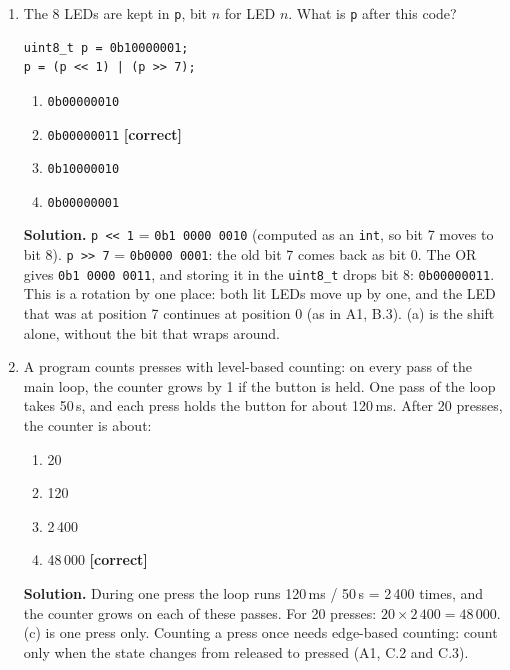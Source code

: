 \documentclass[11pt,a4paper]{article}
\newcommand{\correct}{\quad\textcolor{green!50!black}{\textbf{[correct]}}}
\newenvironment{solution}{\par\noindent\ignorespaces}{\par}
\begin{document}
\begin{enumerate}[label=\textbf{Q\arabic*.}, leftmargin=2.5em, itemsep=6pt]
  \item The 8 LEDs are kept in \texttt{p}, bit $n$ for LED $n$. What is \texttt{p} after this code?
\begin{lstlisting}
uint8_t p = 0b10000001;
p = (p << 1) | (p >> 7);
\end{lstlisting}
  \begin{enumerate}[label=(\alph*)]
    \item \texttt{0b00000010}
    \item \texttt{0b00000011} \correct
    \item \texttt{0b10000010}
    \item \texttt{0b00000001}
  \end{enumerate}
  \begin{solution}
  \textbf{Solution.} \texttt{p <{}< 1} = \texttt{0b1\,0000\,0010} (computed as an \texttt{int}, so bit 7 moves to bit
  8). \texttt{p >{}> 7} = \texttt{0b0000\,0001}: the old bit 7 comes back as bit 0. The OR gives
  \texttt{0b1\,0000\,0011}, and storing it in the \texttt{uint8\_t} drops bit 8: \texttt{0b00000011}. This is a
  rotation by one place: both lit LEDs move up by one, and the LED that was at position 7 continues at position 0
  (as in A1, B.3). (a) is the shift alone, without the bit that wraps around.
  \end{solution}

  \item A program counts presses with level-based counting: on every pass of the main loop, the counter grows by 1 if
  the button is held. One pass of the loop takes 50\,\textmu s, and each press holds the button for about 120\,ms.
  After 20 presses, the counter is about:
  \begin{enumerate}[label=(\alph*)]
    \item 20
    \item 120
    \item 2\,400
    \item 48\,000 \correct
  \end{enumerate}
  \begin{solution}
  \textbf{Solution.} During one press the loop runs 120\,ms / 50\,\textmu s = 2\,400 times, and the
  counter grows on each of these passes. For 20 presses: $20 \times 2\,400 = 48\,000$. (c) is one press only. Counting
  a press once needs edge-based counting: count only when the state changes from released to pressed (A1, C.2 and C.3).
  \end{solution}


\end{enumerate}
\end{document}
